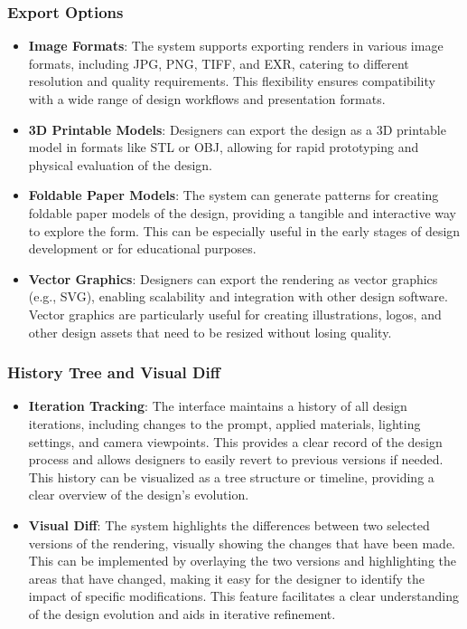 \documentclass[12pt]{report}
\begin{document}
\subsubsection{Export Options}
\begin{itemize}
\item \textbf{Image Formats}: The system supports exporting renders in various image formats, including JPG, PNG, TIFF, and EXR, catering to different resolution and quality requirements. This flexibility ensures compatibility with a wide range of design workflows and presentation formats.
\item \textbf{3D Printable Models}: Designers can export the design as a 3D printable model in formats like STL or OBJ, allowing for rapid prototyping and physical evaluation of the design.
\item \textbf{Foldable Paper Models}: The system can generate patterns for creating foldable paper models of the design, providing a tangible and interactive way to explore the form. This can be especially useful in the early stages of design development or for educational purposes.
\item \textbf{Vector Graphics}: Designers can export the rendering as vector graphics (e.g., SVG), enabling scalability and integration with other design software. Vector graphics are particularly useful for creating illustrations, logos, and other design assets that need to be resized without losing quality.
\end{itemize}

\subsubsection{History Tree and Visual Diff}
\begin{itemize}
\item \textbf{Iteration Tracking}: The interface maintains a history of all design iterations, including changes to the prompt, applied materials, lighting settings, and camera viewpoints. This provides a clear record of the design process and allows designers to easily revert to previous versions if needed. This history can be visualized as a tree structure or timeline, providing a clear overview of the design's evolution.
\item \textbf{Visual Diff}: The system highlights the differences between two selected versions of the rendering, visually showing the changes that have been made. This can be implemented by overlaying the two versions and highlighting the areas that have changed, making it easy for the designer to identify the impact of specific modifications. This feature facilitates a clear understanding of the design evolution and aids in iterative refinement.
\end{itemize}
\end{document}
